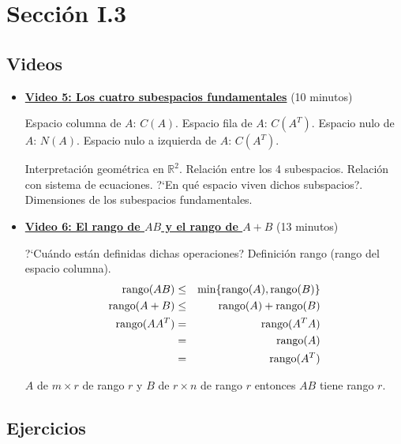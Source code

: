 \documentclass[12pt,a4paper]{article}
\newcommand\1{\mbox{\,\vrule height-0.8pt depth1.0pt width2pc\,}}
\newcommand\2{\mbox{\,\vrule height-0.8pt depth1.0pt width1pc\,}}
\begin{document}
\section{Sección I.3}

\subsection*{Videos}

\begin{itemize}
\item \href{https://youtu.be/n0r3I1fTE64}{\bf Video 5: Los cuatro subespacios fundamentales}
(10 minutos)

Espacio columna de $A$: $C(A)$. Espacio fila de $A$: $C(A^T)$. Espacio nulo de $A$: $N(A)$. Espacio nulo a izquierda de $A$: $C(A^T)$.

Interpretaci\'on geom\'etrica en $\mathbb{R}^2$. Relaci\'on entre los 4 subespacios. Relaci\'on con sistema de ecuaciones. ?`En qué espacio viven dichos subspacios?. Dimensiones de los subespacios fundamentales. 

\item \href{https://youtu.be/E3SiS27K7AE}{\bf Video 6: El rango de $AB$ y el rango de $A+B$}
(13 minutos) 

?`Cuándo están definidas dichas operaciones? Definici\'on rango (rango del espacio columna). 
\begin{eqnarray*}
\hbox{rango}(AB) & \le &\min \{ \hbox{rango}(A), \hbox{rango}(B)\}\\
\hbox{rango}(A+ B) &\le &\hbox{rango}(A) + \hbox{rango}(B) \\
\hbox{rango} (A A^T) &=& \hbox{rango} (A^T A)\\
&=& \hbox{rango}(A)\\
&=& \hbox{rango}(A^T)
\end{eqnarray*}


$A$ de $m\times r$ de rango $r$ y $B$ de $r\times n$
de rango $r$ entonces $AB$ tiene rango $r$.






\end{itemize}

\subsection*{Ejercicios}
\end{document}
